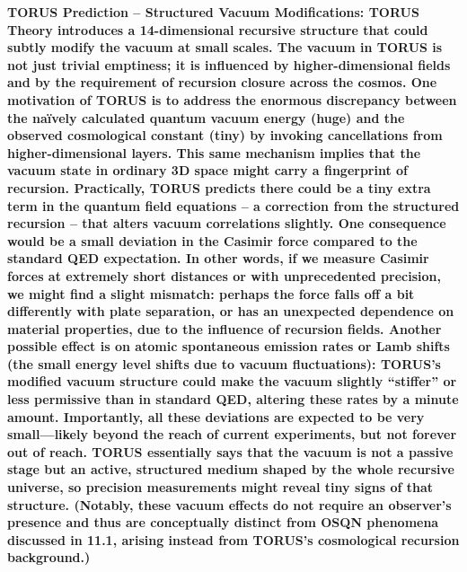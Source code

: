 \documentclass[
]{article}
\begin{document}
\textbf{TORUS Prediction -- Structured Vacuum Modifications: TORUS
Theory introduces a 14-dimensional recursive structure that could subtly
modify the vacuum at small scales. The vacuum in TORUS is not just
trivial emptiness; it is influenced by higher-dimensional fields and by
the requirement of recursion closure across the cosmos. One motivation
of TORUS is to address the enormous discrepancy between the naïvely
calculated quantum vacuum energy (huge) and the observed cosmological
constant (tiny) by invoking cancellations from higher-dimensional
layers. This same mechanism implies that the vacuum state in ordinary 3D
space might carry a fingerprint of recursion. Practically, TORUS
predicts there could be a tiny extra term in the quantum field equations
-- a correction from the structured recursion -- that alters vacuum
correlations slightly. One consequence would be a small deviation in the
Casimir force compared to the standard QED expectation. In other words,
if we measure Casimir forces at extremely short distances or with
unprecedented precision, we might find a slight mismatch: perhaps the
force falls off a bit differently with plate separation, or has an
unexpected dependence on material properties, due to the influence of
recursion fields. Another possible effect is on atomic spontaneous
emission rates or Lamb shifts (the small energy level shifts due to
vacuum fluctuations): TORUS's modified vacuum structure could make the
vacuum slightly ``stiffer'' or less permissive than in standard QED,
altering these rates by a minute amount. Importantly, all these
deviations are expected to be very small---likely beyond the reach of
current experiments, but not forever out of reach. TORUS essentially
says that the vacuum is not a passive stage but an active, structured
medium shaped by the whole recursive universe, so precision measurements
might reveal tiny signs of that structure. (Notably, these vacuum
effects do not require an observer's presence and thus are conceptually
distinct from OSQN phenomena discussed in 11.1, arising instead from
TORUS's cosmological recursion background.)}
\end{document}
